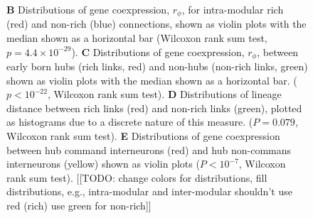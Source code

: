 \documentclass[10pt,letterpaper]{article}
\begin{document}
\begin{figure}[!h]
{%
\textbf{B} Distributions of gene coexpression, $r_\phi$, for intra-modular rich (red) and non-rich (blue) connections, shown as violin plots with the median shown as a horizontal bar (Wilcoxon rank sum test, $p = 4.4\times 10^{-29}$).
\textbf{C} Distributions of gene coexpression, $r_\phi$, between early born hubs (rich links, red) and non-hubs (non-rich links, green) shown as violin plots with the median shown as a horizontal bar. ($p < 10^{-22}$, Wilcoxon rank sum test).
\textbf{D} Distributions of lineage distance between rich links (red) and non-rich links (green), plotted as histograms due to a discrete nature of this measure. ($P = 0.079$, Wilcoxon rank sum test).
\textbf{E} Distributions of gene coexpression between hub command interneurons (red) and hub non-commans interneurons (yellow) shown as violin plots ($P < 10^{-7}$, Wilcoxon rank sum test).
[[TODO: change colors for distributions, fill distributions, e.g., intra-modular and inter-modular shouldn't use red (rich) use green for non-rich]]
}
 \label{fig:OtherInfluences}
\end{figure}
\end{document}
